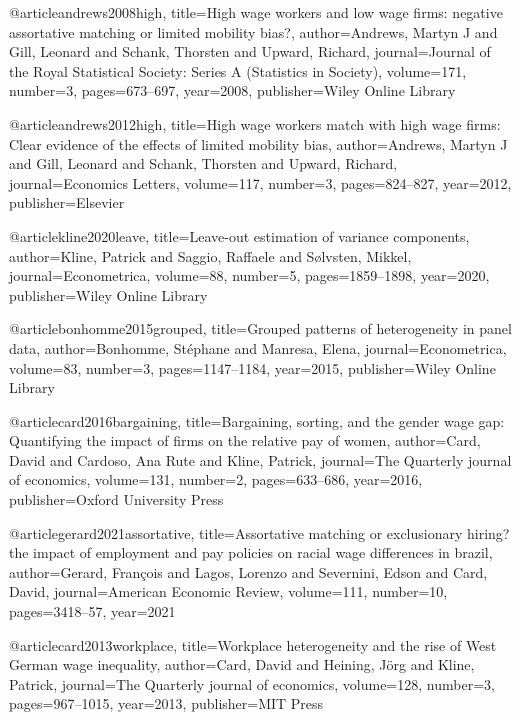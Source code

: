 @article{andrews2008high,
  title={High wage workers and low wage firms: negative assortative matching or limited mobility bias?},
  author={Andrews, Martyn J and Gill, Leonard and Schank, Thorsten and Upward, Richard},
  journal={Journal of the Royal Statistical Society: Series A (Statistics in Society)},
  volume={171},
  number={3},
  pages={673--697},
  year={2008},
  publisher={Wiley Online Library}
}

@article{andrews2012high,
  title={High wage workers match with high wage firms: Clear evidence of the effects of limited mobility bias},
  author={Andrews, Martyn J and Gill, Leonard and Schank, Thorsten and Upward, Richard},
  journal={Economics Letters},
  volume={117},
  number={3},
  pages={824--827},
  year={2012},
  publisher={Elsevier}
}

@article{kline2020leave,
  title={Leave-out estimation of variance components},
  author={Kline, Patrick and Saggio, Raffaele and S{\o}lvsten, Mikkel},
  journal={Econometrica},
  volume={88},
  number={5},
  pages={1859--1898},
  year={2020},
  publisher={Wiley Online Library}
}

@article{bonhomme2015grouped,
  title={Grouped patterns of heterogeneity in panel data},
  author={Bonhomme, St{\'e}phane and Manresa, Elena},
  journal={Econometrica},
  volume={83},
  number={3},
  pages={1147--1184},
  year={2015},
  publisher={Wiley Online Library}
}

@article{card2016bargaining,
  title={Bargaining, sorting, and the gender wage gap: Quantifying the impact of firms on the relative pay of women},
  author={Card, David and Cardoso, Ana Rute and Kline, Patrick},
  journal={The Quarterly journal of economics},
  volume={131},
  number={2},
  pages={633--686},
  year={2016},
  publisher={Oxford University Press}
}

@article{gerard2021assortative,
  title={Assortative matching or exclusionary hiring? the impact of employment and pay policies on racial wage differences in brazil},
  author={Gerard, Fran{\c{c}}ois and Lagos, Lorenzo and Severnini, Edson and Card, David},
  journal={American Economic Review},
  volume={111},
  number={10},
  pages={3418--57},
  year={2021}
}

@article{card2013workplace,
  title={Workplace heterogeneity and the rise of West German wage inequality},
  author={Card, David and Heining, J{\"o}rg and Kline, Patrick},
  journal={The Quarterly journal of economics},
  volume={128},
  number={3},
  pages={967--1015},
  year={2013},
  publisher={MIT Press}
}

